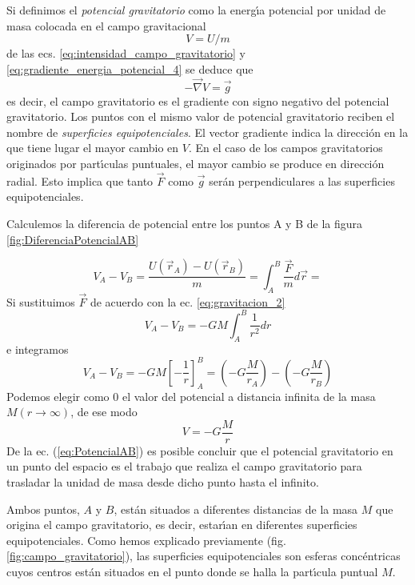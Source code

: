 Si definimos el \emph{potencial gravitatorio} como la energ\'\i{}a potencial por unidad de masa colocada en el campo gravitacional
\begin{equation}
V=U/m
\label{eq:definicion_potencial_gravitatorio}
\end{equation}
de las ecs. \ref{eq:intensidad_campo_gravitatorio} y \ref{eq:gradiente_energia_potencial_4} se deduce que
\begin{equation}
- \vec{\nabla} V =  \vec{g} 
\label{eq:gradiente_potecial_intensidad_campo}
\end{equation}
es decir, el campo gravitatorio es el gradiente con signo negativo del potencial gravitatorio. Los puntos con el mismo valor de potencial gravitatorio reciben el nombre de \emph{superficies equipotenciales}. 
El vector gradiente indica la direcci\'on en la que tiene lugar el mayor cambio en $V$. En el caso de los campos gravitatorios originados por part\'\i{}culas puntuales, el  mayor cambio se produce en direcci\'on radial.
Esto implica que tanto $\vec{F}$ como $\vec{g}$  ser\'an perpendiculares a las superficies equipotenciales.

Calculemos la diferencia de potencial entre los puntos A y B de la figura \ref{fig:DiferenciaPotencialAB}

\begin{equation}
V_A-V_B=\frac{U(\vec{r}_A)-U(\vec{r}_B)}{m}=\int_A^B\frac{\vec{F}}{m} d\vec{r}=
\label{eq:diferenciaPotencialAB}
\end{equation}
Si sustituimos $\vec{F}$ de acuerdo con la ec. \ref{eq:gravitacion_2}
\begin{equation}
V_A-V_B=-GM \int_A^B \frac{1}{r^2}dr
\label{eq:diferenciaPotencialAB_2}
\end{equation}
e integramos
\begin{equation}
V_A-V_B=-GM\left[ -\frac{1}{r}\right]_A^B=\left(-G\frac{M}{r_A}\right)-\left(-G\frac{M}{r_B}\right)
\label{eq:diferenciaPotencialAB_22}
\end{equation}
Podemos elegir como $0$ el valor del potencial a distancia infinita de la masa $M(r\rightarrow \infty)$, de ese modo
\begin{equation}
V=-G\frac{M}{r}
\label{eq:PotencialAB}
\end{equation}
De la ec. (\ref{eq:PotencialAB}) es posible concluir que el potencial gravitatorio en un punto del espacio es el trabajo que realiza el campo gravitatorio para trasladar la unidad de masa desde dicho punto hasta el infinito.


Ambos puntos, $A$ y $B$, est\'an situados a diferentes distancias de la masa $M$ que origina el campo gravitatorio, es decir, estar\'\i{}an en diferentes superficies equipotenciales. Como hemos explicado previamente (fig. \ref{fig:campo_gravitatorio}), las superficies equipotenciales son esferas conc\'entricas cuyos centros est\'an situados en el punto donde se halla la part\'\i{}cula puntual $M$. 

